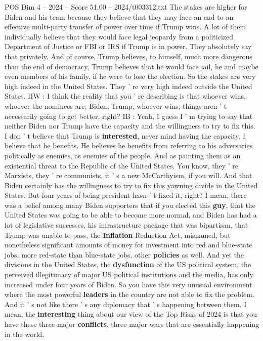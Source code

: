 \begin{textsample}{POS Dim 4 – 2024 – Score 51.00 – 2024/t003312.txt}
The stakes are higher for Biden and his team because they believe that they may face an end to an effective multi-party transfer of power over time if Trump wins.
A lot of them individually believe that they would face legal jeopardy from a politicized Department of Justice or FBI or IRS if Trump is in power.
They absolutely say that privately.
And of course, Trump believes, to himself, much more dangerous than the end of democracy, Trump believes that he would face jail, he and maybe even members of his family, if he were to lose the election.
So the stakes are very high indeed in the United States.
They ' re very high indeed outside the United States.
HW : I think the reality that you ' re describing is that whoever wins, whoever the nominees are, Biden, Trump, whoever wins, things aren ' t necessarily going to get better, right?
IB : Yeah, I guess I ' m trying to say that neither Biden nor Trump have the capacity and the willingness to try to fix this.
I don ' t believe that Trump is \textbf{interested}, never mind having the capacity.
I believe that he benefits.
He believes he benefits from referring to his adversaries politically as enemies, as enemies of the people.
And as painting them as an existential threat to the Republic of the United States.
You know, they ' re Marxists, they ' re communists, it ' s a new McCarthyism, if you will.
And that Biden certainly has the willingness to try to fix this yawning divide in the United States.
But four years of being president hasn ' t fixed it, right?
I mean, there was a belief among many Biden supporters that if you elected this \textbf{guy}, that the United States was going to be able to become more normal, and Biden has had a lot of legislative successes, his infrastructure package that was bipartisan, that Trump was unable to pass, the \textbf{Inflation} Reduction Act, misnamed, but nonetheless significant amounts of money for investment into red and blue-state jobs, more red-state than blue-state jobs, other \textbf{policies} as well.
And yet the divisions in the United States, the \textbf{dysfunction} of the US political system, the perceived illegitimacy of major US political institutions and the media, has only increased under four years of Biden.
So you have this very unusual environment where the most powerful \textbf{leaders} in the country are not able to fix the problem.
And it ' s not like there ' s any diplomacy that ' s happening between them.
I mean, the \textbf{interesting} thing about our view of the Top Risks of 2024 is that you have these three major \textbf{conflicts}, three major wars that are essentially happening in the world.

\end{textsample}
